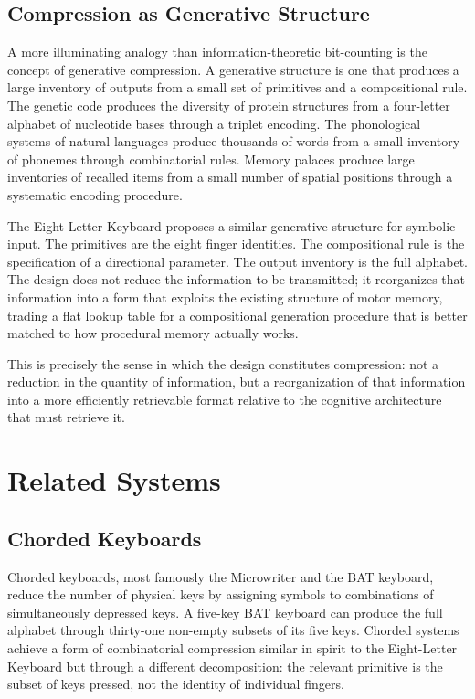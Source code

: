 \documentclass[12pt,a4paper]{article}
\theoremstyle{plain}
\theoremstyle{definition}
\theoremstyle{remark}
\begin{document}
\subsection{Compression as Generative Structure}

A more illuminating analogy than information-theoretic bit-counting is the
concept of generative compression. A generative structure is one that produces
a large inventory of outputs from a small set of primitives and a compositional
rule. The genetic code produces the diversity of protein structures from a
four-letter alphabet of nucleotide bases through a triplet encoding. The
phonological systems of natural languages produce thousands of words from a
small inventory of phonemes through combinatorial rules. Memory palaces produce
large inventories of recalled items from a small number of spatial positions
through a systematic encoding procedure.

The Eight-Letter Keyboard proposes a similar generative structure for symbolic
input. The primitives are the eight finger identities. The compositional rule
is the specification of a directional parameter. The output inventory is the
full alphabet. The design does not reduce the information to be transmitted; it
reorganizes that information into a form that exploits the existing structure of
motor memory, trading a flat lookup table for a compositional generation
procedure that is better matched to how procedural memory actually works.

This is precisely the sense in which the design constitutes compression: not a
reduction in the quantity of information, but a reorganization of that
information into a more efficiently retrievable format relative to the cognitive
architecture that must retrieve it.

\section{Related Systems}

\subsection{Chorded Keyboards}

Chorded keyboards, most famously the Microwriter and the BAT keyboard, reduce
the number of physical keys by assigning symbols to combinations of
simultaneously depressed keys. A five-key BAT keyboard can produce the full
alphabet through thirty-one non-empty subsets of its five keys. Chorded systems
achieve a form of combinatorial compression similar in spirit to the Eight-Letter
Keyboard but through a different decomposition: the relevant primitive is the
subset of keys pressed, not the identity of individual fingers.
\end{document}
